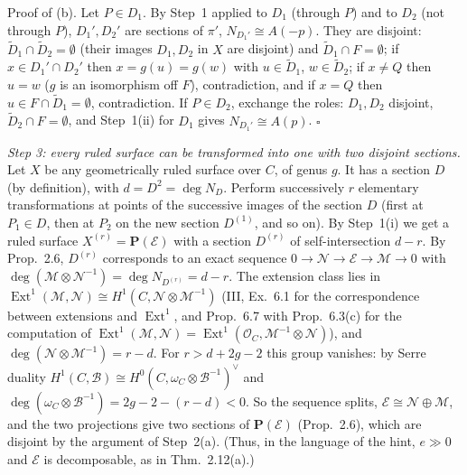 \documentclass[11pt]{article}
\begin{document}
Proof of (b). Let $P\in D_1$. By Step~1 applied to $D_1$ (through $P$) and to $D_2$ (not through $P$), $D_1',D_2'$ are sections of $\pi'$, $N_{D_1'}\cong A(-p)$. They are disjoint: $\widetilde D_1\cap\widetilde D_2=\emptyset$ (their images $D_1,D_2$ in $X$ are disjoint) and $\widetilde D_1\cap F=\emptyset$; if $x\in D_1'\cap D_2'$ then $x=g(u)=g(w)$ with $u\in\widetilde D_1$, $w\in\widetilde D_2$; if $x\ne Q$ then $u=w$ ($g$ is an isomorphism off $F$), contradiction, and if $x=Q$ then $u\in F\cap\widetilde D_1=\emptyset$, contradiction. If $P\in D_2$, exchange the roles: $D_1,D_2$ disjoint, $\widetilde D_2\cap F=\emptyset$, and Step~1(ii) for $D_1$ gives $N_{D_1'}\cong A(p)$. $\square$

\emph{Step 3: every ruled surface can be transformed into one with two disjoint sections.} Let $X$ be any geometrically ruled surface over $C$, of genus $g$. It has a section $D$ (by definition), with $d=D^2=\deg N_D$. Perform successively $r$ elementary transformations at points of the successive images of the section $D$ (first at $P_1\in D$, then at $P_2$ on the new section $D^{(1)}$, and so on). By Step~1(i) we get a ruled surface $X^{(r)}=\mathbf P(\mathcal E)$ with a section $D^{(r)}$ of self-intersection $d-r$. By Prop.~2.6, $D^{(r)}$ corresponds to an exact sequence $0\to\mathcal N\to\mathcal E\to\mathcal M\to0$ with $\deg(\mathcal M\otimes\mathcal N^{-1})=\deg N_{D^{(r)}}=d-r$. The extension class lies in $\operatorname{Ext}^1(\mathcal M,\mathcal N)\cong H^1(C,\mathcal N\otimes\mathcal M^{-1})$ (III, Ex.~6.1 for the correspondence between extensions and $\operatorname{Ext}^1$, and Prop.~6.7 with Prop.~6.3(c) for the computation of $\operatorname{Ext}^1(\mathcal M,\mathcal N)=\operatorname{Ext}^1(\mathcal O_C,\mathcal M^{-1}\otimes\mathcal N)$), and $\deg(\mathcal N\otimes\mathcal M^{-1})=r-d$. For $r>d+2g-2$ this group vanishes: by Serre duality $H^1(C,\mathcal B)\cong H^0(C,\omega_C\otimes\mathcal B^{-1})^\vee$ and $\deg(\omega_C\otimes\mathcal B^{-1})=2g-2-(r-d)<0$. So the sequence splits, $\mathcal E\cong\mathcal N\oplus\mathcal M$, and the two projections give two sections of $\mathbf P(\mathcal E)$ (Prop.~2.6), which are disjoint by the argument of Step~2(a). (Thus, in the language of the hint, $e\gg0$ and $\mathcal E$ is decomposable, as in Thm.~2.12(a).)
\end{document}
